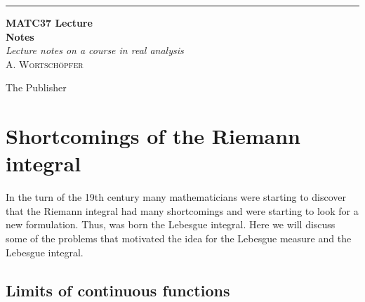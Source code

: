 \documentclass[a4paper, 11pt]{book}
\newcommand*{\plogo}{\fbox{$\mathcal{DB}$}}
\theoremstyle{definition}
\theoremstyle{remark}
\begin{document}
    \begin{titlepage} 
        \raggedleft

        \rule{1pt}{\textheight} %
        \hspace{0.05\textwidth} %
        \parbox[b]{0.75\textwidth}{ %
                            
            {\Huge\bfseries MATC37 Lecture \\[0.5\baselineskip] Notes }\\[2\baselineskip] %
            {\large\textit{Lecture notes on a course in real analysis}}\\[4\baselineskip] %
            {\Large\textsc{A. Wortschöpfer}} %
                                                    
            \vspace{0.5\textheight} %
                                                            
            {\noindent The Publisher~~\plogo}\\[\baselineskip] %
        }
    \end{titlepage}

    \chapter{Shortcomings of the Riemann integral}

    In the turn of the 19th century many mathematicians were starting to discover that the Riemann integral had many shortcomings
    and were starting to look for a new formulation. Thus, was born the Lebesgue integral. Here we will discuss some of the problems
    that motivated the idea for the Lebesgue measure and the Lebesgue integral.

    \section{Limits of continuous functions}
\end{document}
